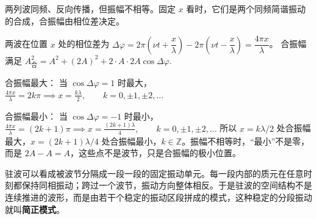 \begin{solution}
两列波同频、反向传播，但振幅不相等。固定 \(x\) 看时，它们是两个同频简谐振动的合成，合振幅由相位差决定。

两波在位置 \(x\) 处的相位差为 \(\Delta\varphi=2\pi\left(\nu t+\dfrac{x}{\lambda}\right)-2\pi\left(\nu t-\dfrac{x}{\lambda}\right)=\dfrac{4\pi x}{\lambda}\)。
合振幅满足
 \(A_{\text{合}}^2=A^2+(2A)^2+2\cdot A\cdot2A\cos\Delta\varphi.\) 

合振幅最大： 当 \(\cos\Delta\varphi=1\) 时最大，
 \(\frac{4\pi x}{\lambda}=2k\pi \implies x=\frac{k\lambda}{2}, \qquad k=0,\pm1,\pm2,\dots\) 

合振幅最小： 当 \(\cos\Delta\varphi=-1\) 时最小，
 \(\frac{4\pi x}{\lambda}=(2k+1)\pi \implies x=\frac{(2k+1)\lambda}{4}, \qquad k=0,\pm1,\pm2,\dots\) 
所以 \(x=k\lambda/2\) 处合振幅最大，\(x=(2k+1)\lambda/4\) 处合振幅最小，\(k\in\mathbb{Z}\)。振幅不相等时，“最小”不是零，而是 \(2A-A=A\)，这些点不是波节，只是合振幅的极小位置。
\end{solution}

\begin{definition}[简正模式]
驻波可以看成被波节分隔成一段一段的固定振动单元。每一段内部的质元在任意时刻都保持同相振动；跨过一个波节，振动方向整体相反。于是驻波的空间结构不是连续推进的波形，而是由若干个稳定的振动区段拼成的模式，这种稳定的分段振动就叫\textbf{简正模式}。
\end{definition}
